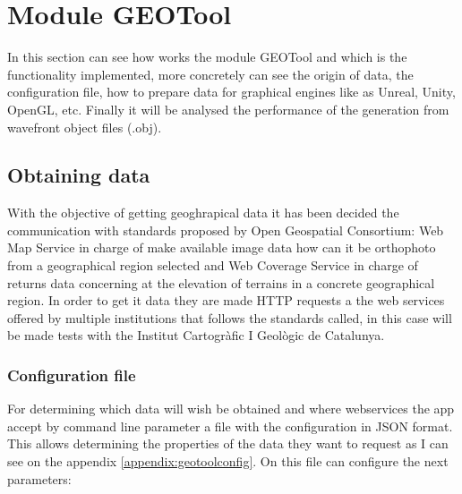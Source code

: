\documentclass[10pt,a4paper,twocolumn,twoside]{article}
\begin{document}
\section{Module GEOTool}

In this section can see how works the module GEOTool and which is the functionality implemented, more concretely can see the origin of data, the configuration file, how to prepare data for graphical engines like as Unreal, Unity, OpenGL, etc. Finally it will be analysed the performance of the generation from wavefront object files (.obj).

\subsection{Obtaining data}
\label{getdata}

With the objective of getting geoghrapical data it has been decided the communication with standards proposed by Open Geospatial Consortium\cite{ogc}: Web Map Service\cite{wms} in charge of make available image data how can it be orthophoto from a geographical region selected and Web Coverage Service\cite{wms} in charge of returns data concerning at the elevation of terrains in a concrete geographical region. In order to get it data they are made HTTP requests a the web services offered by multiple institutions that follows the standards called, in this case will be made tests with the Institut Cartogràfic I Geològic de Catalunya\cite{icgc}.

\subsubsection{Configuration file}

For determining which data will wish be obtained and where webservices the app accept by command line parameter a file with the configuration in JSON format. This allows determining the properties of the data they want to request as I can see on the appendix \ref{appendix:geotoolconfig}. On this file can configure the next parameters:
\end{document}
